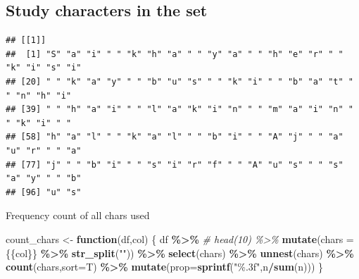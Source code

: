 \documentclass[
]{article}
\newenvironment{Shaded}{\begin{snugshade}}{\end{snugshade}}
\newcommand{\CommentTok}[1]{\textcolor[rgb]{0.56,0.35,0.01}{\textit{#1}}}
\newcommand{\ControlFlowTok}[1]{\textcolor[rgb]{0.13,0.29,0.53}{\textbf{#1}}}
\newcommand{\DataTypeTok}[1]{\textcolor[rgb]{0.13,0.29,0.53}{#1}}
\newcommand{\DecValTok}[1]{\textcolor[rgb]{0.00,0.00,0.81}{#1}}
\newcommand{\KeywordTok}[1]{\textcolor[rgb]{0.13,0.29,0.53}{\textbf{#1}}}
\newcommand{\NormalTok}[1]{#1}
\newcommand{\OperatorTok}[1]{\textcolor[rgb]{0.81,0.36,0.00}{\textbf{#1}}}
\newcommand{\StringTok}[1]{\textcolor[rgb]{0.31,0.60,0.02}{#1}}
\begin{document}
\hypertarget{study-characters-in-the-set}{%
\subsection{Study characters in the
set}\label{study-characters-in-the-set}}

\begin{Shaded}
\end{Shaded}

\begin{verbatim}
## [[1]]
##  [1] "S" "a" "i" " " "k" "h" "a" " " "y" "a" " " "h" "e" "r" " " "k" "i" "s" "i"
## [20] " " "k" "a" "y" " " "b" "u" "s" " " "k" "i" " " "b" "a" "t" " " "n" "h" "i"
## [39] " " "h" "a" "i" " " "l" "a" "k" "i" "n" " " "m" "a" "i" "n" " " "k" "i" " "
## [58] "h" "a" "l" " " "k" "a" "l" " " "b" "i" " " "A" "j" " " "a" "u" "r" " " "a"
## [77] "j" " " "b" "i" " " "s" "i" "r" "f" " " "A" "u" "s" " " "s" "a" "y" " " "b"
## [96] "u" "s"
\end{verbatim}

Frequency count of all chars used

\begin{Shaded}
\begin{Highlighting}[]
\NormalTok{count\_chars \textless{}{-}}\StringTok{ }\ControlFlowTok{function}\NormalTok{(df,col) \{}
\NormalTok{  df }\OperatorTok{\%\textgreater{}\%}\StringTok{  }\CommentTok{\# head(10) \%\textgreater{}\%}
\StringTok{  }\KeywordTok{mutate}\NormalTok{(}\DataTypeTok{chars =}\NormalTok{ \{\{col\}\} }\OperatorTok{\%\textgreater{}\%}\StringTok{ }\KeywordTok{str\_split}\NormalTok{(}\StringTok{""}\NormalTok{)) }\OperatorTok{\%\textgreater{}\%}
\StringTok{  }\KeywordTok{select}\NormalTok{(chars) }\OperatorTok{\%\textgreater{}\%}
\StringTok{  }\KeywordTok{unnest}\NormalTok{(chars) }\OperatorTok{\%\textgreater{}\%}
\StringTok{  }\KeywordTok{count}\NormalTok{(chars,}\DataTypeTok{sort=}\NormalTok{T) }\OperatorTok{\%\textgreater{}\%}
\StringTok{  }\KeywordTok{mutate}\NormalTok{(}\DataTypeTok{prop=}\KeywordTok{sprintf}\NormalTok{(}\StringTok{"\%.3f"}\NormalTok{,n}\OperatorTok{/}\KeywordTok{sum}\NormalTok{(n)))  }
\NormalTok{\}}
\end{Highlighting}
\end{Shaded}
\end{document}
